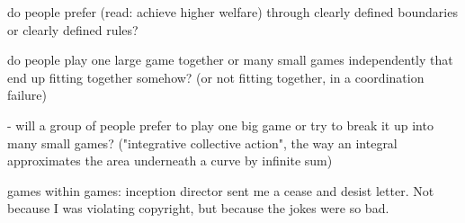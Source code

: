 do people prefer (read: achieve higher welfare) through clearly defined boundaries or clearly defined rules? 

do people play one large game together or many small games independently that end up fitting together somehow? (or not fitting together, in a coordination failure) 
	
		- will a group of people prefer to play one big game or try to break it up into many small games? 			("integrative collective action", the way an integral approximates the area underneath a curve by 			infinite sum)

games within games: inception director sent me a cease and desist letter. Not because I was violating copyright, but because the jokes were so bad. 





